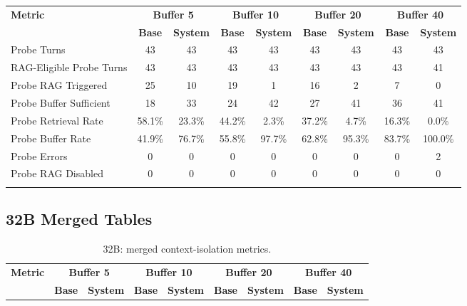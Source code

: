 \documentclass[pdflatex,sn-mathphys-num]{sn-jnl}%
\theoremstyle{thmstyleone}%
\theoremstyle{thmstyletwo}%
\theoremstyle{thmstylethree}%
\begin{document}
\begin{appendices}
\begin{landscape}
\begin{longtable}{@{}p{3.8cm}cccccccc@{}}
\toprule
\textbf{Metric} & \multicolumn{2}{c}{\textbf{Buffer 5}} & \multicolumn{2}{c}{\textbf{Buffer 10}} & \multicolumn{2}{c}{\textbf{Buffer 20}} & \multicolumn{2}{c}{\textbf{Buffer 40}} \\
\cmidrule(lr){2-3}\cmidrule(lr){4-5}\cmidrule(lr){6-7}\cmidrule(lr){8-9}
 & \textbf{Base} & \textbf{System} & \textbf{Base} & \textbf{System} & \textbf{Base} & \textbf{System} & \textbf{Base} & \textbf{System} \\
\midrule
\endhead
Probe Turns & 43 & 43 & 43 & 43 & 43 & 43 & 43 & 43 \\
RAG-Eligible Probe Turns & 43 & 43 & 43 & 43 & 43 & 43 & 43 & 41 \\
Probe RAG Triggered & 25 & 10 & 19 & 1 & 16 & 2 & 7 & 0 \\
Probe Buffer Sufficient & 18 & 33 & 24 & 42 & 27 & 41 & 36 & 41 \\
Probe Retrieval Rate & 58.1\% & 23.3\% & 44.2\% & 2.3\% & 37.2\% & 4.7\% & 16.3\% & 0.0\% \\
Probe Buffer Rate & 41.9\% & 76.7\% & 55.8\% & 97.7\% & 62.8\% & 95.3\% & 83.7\% & 100.0\% \\
Probe Errors & 0 & 0 & 0 & 0 & 0 & 0 & 0 & 2 \\
Probe RAG Disabled & 0 & 0 & 0 & 0 & 0 & 0 & 0 & 0 \\
\botrule
\end{longtable}
\normalsize
\end{landscape}

\subsection{32B Merged Tables}\label{app:32b_merged}
\begin{landscape}
\tiny
\begin{longtable}{@{}p{3.8cm}cccccccc@{}}
\caption{32B: merged context-isolation metrics.}\label{tab:app_32b_context}\\

\toprule
\textbf{Metric} & \multicolumn{2}{c}{\textbf{Buffer 5}} & \multicolumn{2}{c}{\textbf{Buffer 10}} & \multicolumn{2}{c}{\textbf{Buffer 20}} & \multicolumn{2}{c}{\textbf{Buffer 40}} \\
\cmidrule(lr){2-3}\cmidrule(lr){4-5}\cmidrule(lr){6-7}\cmidrule(lr){8-9}
 & \textbf{Base} & \textbf{System} & \textbf{Base} & \textbf{System} & \textbf{Base} & \textbf{System} & \textbf{Base} & \textbf{System} \\
\midrule
\endfirsthead


\end{longtable}
\end{landscape}
\end{appendices}
\end{document}
